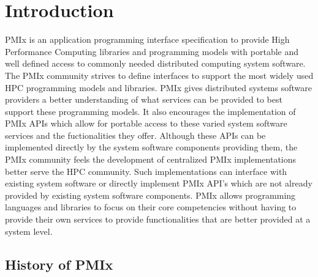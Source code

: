 
\chapter{Introduction}


\ac{PMIx} is an application programming interface specification to provide
High Performance Computing libraries and programming models with
portable and well defined access to commonly needed
distributed computing system software.
The \ac{PMIx} community strives to define interfaces to support the most widely
used HPC programming models and libraries.
\ac{PMIx} gives distributed systems software providers a better understanding of what
services can be provided to best support these programming models.
It also encourages the implementation of \ac{PMIx} APIs which allow for
portable access to these varied system software services and the
fuctionalities they offer.   Although these APIs can be implemented directly by the
system software components providing them, the \ac{PMIx} community
feels the development of centralized \ac{PMIx} implementations better serve the
HPC community.  Such implementations can interface
with existing system software or directly implement PMIx API's which are
not already provided by existing system software components.
\ac{PMIx} allows programming languages and libraries to focus on their core
competencies without having to provide their own services to provide
functionalities that are better provided at a system level.

\section{History of PMIx}
\label{chap:history}

